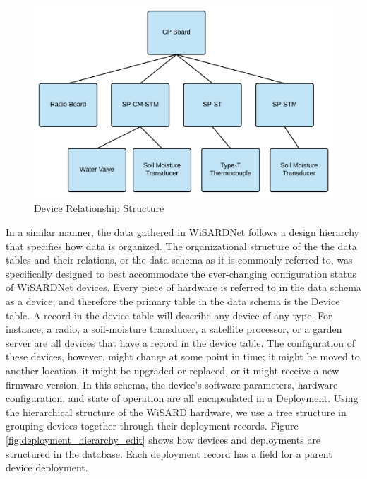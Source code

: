\begin{figure}[htbp]
	\centering
	\includegraphics[width=\textwidth]{figures/wisard_device_hierarchy.png}
	\caption{Device Relationship Structure}
	\label{fig:device_hierarchy_edit}
\end{figure}

In a similar manner, the data gathered in WiSARDNet follows a design hierarchy that specifies how data is organized. The organizational structure of the the data tables and their relations, or the data schema as it is commonly referred to, was specifically designed to best accommodate the ever-changing configuration status of WiSARDNet devices. Every piece of hardware is referred to in the data schema as a device, and therefore the primary table in the data schema is the Device table. A record in the device table will describe any device of any type. For instance, a radio, a soil-moisture transducer, a satellite processor, or a garden server are all devices that have a record in the device table. The configuration of these devices, however, might change at some point in time; it might be moved to another location, it might be upgraded or replaced, or it might receive a new firmware version. In this schema, the device's software parameters, hardware configuration, and state of operation are all encapsulated in a Deployment. Using the hierarchical structure of the WiSARD hardware, we use a tree structure in grouping devices together through their deployment records. Figure \ref{fig:deployment_hierarchy_edit} shows how devices and deployments are structured in the database. Each deployment record has a field for a parent device deployment. 


